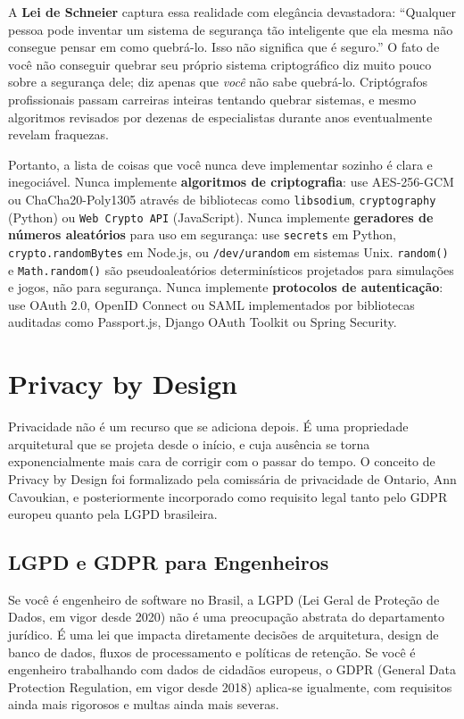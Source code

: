 A \textbf{Lei de Schneier} captura essa realidade com elegância devastadora:
``Qualquer pessoa pode inventar um sistema de segurança tão inteligente que ela
mesma não consegue pensar em como quebrá-lo. Isso não significa que é seguro.''
O fato de você não conseguir quebrar seu próprio sistema criptográfico diz muito
pouco sobre a segurança dele; diz apenas que \emph{você} não sabe quebrá-lo.
Criptógrafos profissionais passam carreiras inteiras tentando quebrar sistemas, e
mesmo algoritmos revisados por dezenas de especialistas durante anos eventualmente
revelam fraquezas.

Portanto, a lista de coisas que você nunca deve implementar sozinho é clara e
inegociável. Nunca implemente \textbf{algoritmos de criptografia}: use AES-256-GCM
ou ChaCha20-Poly1305 através de bibliotecas como \texttt{libsodium},
\texttt{cryptography} (Python) ou \texttt{Web Crypto API} (JavaScript). Nunca
implemente \textbf{geradores de números aleatórios} para uso em segurança: use
\texttt{secrets} em Python, \texttt{crypto.randomBytes} em Node.js, ou
\texttt{/dev/urandom} em sistemas Unix. \texttt{random()} e
\texttt{Math.random()} são pseudoaleatórios determinísticos projetados para
simulações e jogos, não para segurança. Nunca implemente \textbf{protocolos de
autenticação}: use OAuth 2.0, OpenID Connect ou SAML implementados por
bibliotecas auditadas como Passport.js, Django OAuth Toolkit ou Spring Security.

\section{Privacy by Design}

Privacidade não é um recurso que se adiciona depois. É uma propriedade
arquitetural que se projeta desde o início, e cuja ausência se torna
exponencialmente mais cara de corrigir com o passar do tempo. O conceito de
Privacy by Design foi formalizado pela comissária de privacidade de Ontario, Ann
Cavoukian, e posteriormente incorporado como requisito legal tanto pelo GDPR
europeu quanto pela LGPD brasileira.

\subsection{LGPD e GDPR para Engenheiros}

Se você é engenheiro de software no Brasil, a LGPD (Lei Geral de Proteção de
Dados, em vigor desde 2020) não é uma preocupação abstrata do departamento
jurídico. É uma lei que impacta diretamente decisões de arquitetura, design de
banco de dados, fluxos de processamento e políticas de retenção. Se você é
engenheiro trabalhando com dados de cidadãos europeus, o GDPR (General Data
Protection Regulation, em vigor desde 2018) aplica-se igualmente, com requisitos
ainda mais rigorosos e multas ainda mais severas.

